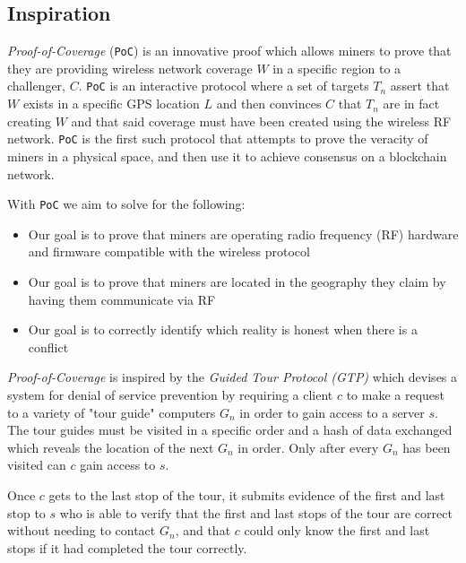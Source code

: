 \documentclass[letterpaper,11pt]{article}
\def\coverage/{$\mathit{W}$}
\def\location/{$\mathit{L}$}
\def\proofofcoverage/{\textit{Proof-of-Coverage}}
\begin{document}
\subsection{Inspiration}

\proofofcoverage/ (\verb|PoC|) is an innovative proof which allows miners to prove that they are providing wireless network coverage \coverage/ in a specific region to a challenger, $\mathit{C}$. \verb|PoC| is an interactive protocol where a set of targets $\mathit{T_n}$ assert that \coverage/ exists in a specific GPS location \location/ and then convinces $\mathit{C}$ that $\mathit{T_n}$ are in fact creating \coverage/ and that said coverage must have been created using the wireless RF network. \verb|PoC| is the first such protocol that attempts to prove the veracity of miners in a physical space, and then use it to achieve consensus on a blockchain network.\newline

With \verb|PoC| we aim to solve for the following:

\begin{itemize}
	\item Our goal is to prove that miners are operating radio frequency (RF) hardware and firmware compatible with the wireless protocol
	\item Our goal is to prove that miners are located in the geography they claim by having them communicate via RF
	\item Our goal is to correctly identify which reality is honest when there is a conflict
\end{itemize}

\proofofcoverage/ is inspired by the \textit{Guided Tour Protocol (GTP)} which devises a system for denial of service prevention by requiring a client $\mathit{c}$ to make a request to a variety of "tour guide" computers $\mathit{G_n}$ in order to gain access to a server $\mathit{s}$. The tour guides must be visited in a specific order and a hash of data exchanged which reveals the location of the next $\mathit{G_n}$ in order. Only after every $\mathit{G_n}$ has been visited can $\mathit{c}$ gain access to $\mathit{s}$.\newline

Once $\mathit{c}$ gets to the last stop of the tour, it submits evidence of the first and last stop to $\mathit{s}$ who is able to verify that the first and last stops of the tour are correct without needing to contact $\mathit{G_n}$, and that $\mathit{c}$ could only know the first and last stops if it had completed the tour correctly.\newline
\end{document}

